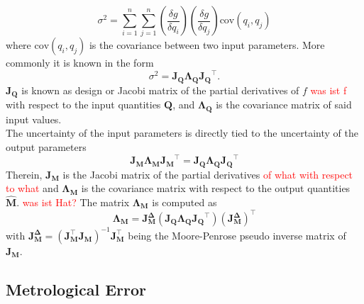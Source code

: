 \documentclass[5p,times,procedia]{elsarticle}
\begin{document}
\begin{equation}
	\sigma^2 = \sum_{i=1}^{n}\sum_{j=1}^{n} \left(\frac{\delta g}{\delta q_i}\right) \left(\frac{\delta g}{\delta q_j}\right) \mathrm{cov}(q_i, q_j) 
\end{equation}
where $\mathrm{cov}(q_i, q_j) $ is the covariance between two input parameters. More commonly it is known in the form~\cite{Cox2006}  
\begin{equation}
	\sigma^2 = \mathbf{J_{Q}}\mathbf{\Lambda_{Q}}\mathbf{J_{Q}}^{\top}.
\end{equation}
$\mathbf{J_{Q}}$ is known as design or Jacobi matrix of the partial derivatives of $f$ \textcolor{red}{was ist f} with respect to the input quantities $\mathbf{Q}$, and $\mathbf{\Lambda_Q}$ is the covariance matrix of said input values. \\
The uncertainty of the input parameters is directly tied to the uncertainty of the output parameters
\begin{equation}
	\mathbf{J_{M}}\mathbf{\Lambda_{M}}\mathbf{J_{M}}^{\top} = \mathbf{J_{Q}}\mathbf{\Lambda_{Q}}\mathbf{J_{Q}}^{\top}
\end{equation}
Therein, $\mathbf{J_{M}}$ is the Jacobi matrix of the partial derivatives \textcolor{red}{of what with respect to what} and $\mathbf{\Lambda_{M}}$ is the covariance matrix with respect to the output quantities $\hat{\mathbf{M}}$.
\textcolor{red}{was ist Hat?}
The matrix $\mathbf{\Lambda_{M}}$ is computed as
\begin{equation}
	\mathbf{\Lambda_{M}} = \mathbf{J_{M}^{\Delta}} \left( \mathbf{J_{Q}}\mathbf{\Lambda_{Q}}\mathbf{J_{Q}}^{\top}\right) \left(\mathbf{J_{M}^{\Delta}}\right)^{\top}
\end{equation}
with $ \mathbf{J_{M}^{\Delta}} = \left( \mathbf{J_{M}^{\top}} \mathbf{J_{M}^{}} \right)^{-1}\mathbf{J_{M}^{\top}}$ being the Moore-Penrose pseudo inverse matrix of $\mathbf{J_M}$.

\subsection{Metrological Error}
\label{error_estimate}
\end{document}
